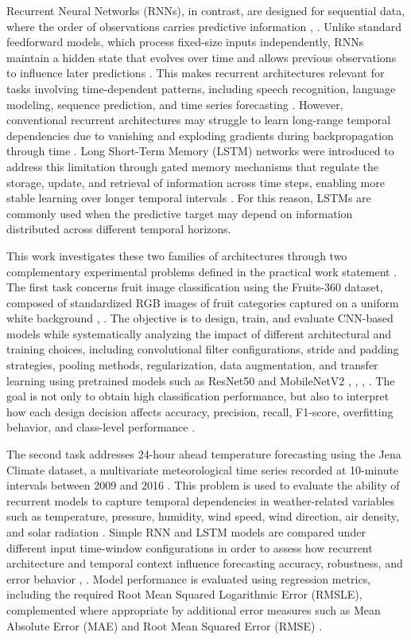 \documentclass[conference]{IEEEtran}
\begin{document}
Recurrent Neural Networks (RNNs), in contrast, are designed for sequential data, where the order of observations carries predictive information \cite{b2}, \cite{b8}. Unlike standard feedforward models, which process fixed-size inputs independently, RNNs maintain a hidden state that evolves over time and allows previous observations to influence later predictions \cite{b8}. This makes recurrent architectures relevant for tasks involving time-dependent patterns, including speech recognition, language modeling, sequence prediction, and time series forecasting \cite{b8}. However, conventional recurrent architectures may struggle to learn long-range temporal dependencies due to vanishing and exploding gradients during backpropagation through time \cite{b9}. Long Short-Term Memory (LSTM) networks were introduced to address this limitation through gated memory mechanisms that regulate the storage, update, and retrieval of information across time steps, enabling more stable learning over longer temporal intervals \cite{b9}. For this reason, LSTMs are commonly used when the predictive target may depend on information distributed across different temporal horizons.

This work investigates these two families of architectures through two complementary experimental problems defined in the practical work statement 
\cite{b10}. The first task concerns fruit image classification using the Fruits-360 dataset, composed of standardized RGB images of fruit categories captured on a uniform white background \cite{b10}, \cite{b11}. The objective is to design, train, and evaluate CNN-based models while systematically analyzing the impact of different architectural and training choices, including convolutional filter configurations, stride and padding strategies, pooling methods, regularization, data augmentation, and transfer learning using pretrained models such as ResNet50 and MobileNetV2 \cite{b3}, \cite{b6}, \cite{b7}, \cite{b10}. The goal is not only to obtain high classification performance, but also to interpret how each design decision affects accuracy, precision, recall, F1-score, overfitting behavior, and class-level performance \cite{b10}.

The second task addresses 24-hour ahead temperature forecasting using the Jena Climate dataset, a multivariate meteorological time series recorded at 10-minute intervals between 2009 and 2016 \cite{b10}. This problem is used to evaluate the ability of recurrent models to capture temporal dependencies in weather-related variables such as temperature, pressure, humidity, wind speed, wind direction, air density, and solar radiation \cite{b10}. Simple RNN and LSTM models are compared under different input time-window configurations in order to assess how recurrent architecture and temporal context influence forecasting accuracy, robustness, and error behavior \cite{b8}, \cite{b10}. Model performance is evaluated using regression metrics, including the required Root Mean Squared Logarithmic Error (RMSLE), complemented where appropriate by additional error measures such as Mean Absolute Error (MAE) and Root Mean Squared Error (RMSE) \cite{b10}.
\end{document}
